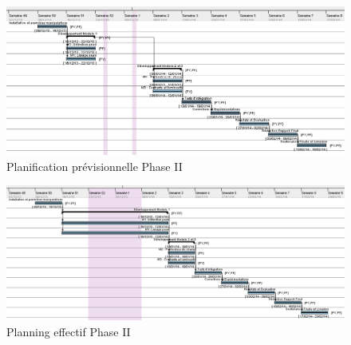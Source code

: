 \documentclass[11pt, french]{report-rd-info}
\begin{document}
\begin{figure}
	\centering
		\includegraphics[width=1\textwidth]{Gantts/p2_previsionnel}
	\caption{Planification prévisionnelle Phase II}
	\label{fig:PlanningPrevisionnel2}
\end{figure}
\begin{figure}
	\centering
		\includegraphics[width=1\textwidth]{Gantts/p2_effectif}
	\caption{Planning effectif Phase II}
	\label{fig:PlanningEffectif2}
\end{figure}
\end{document}
